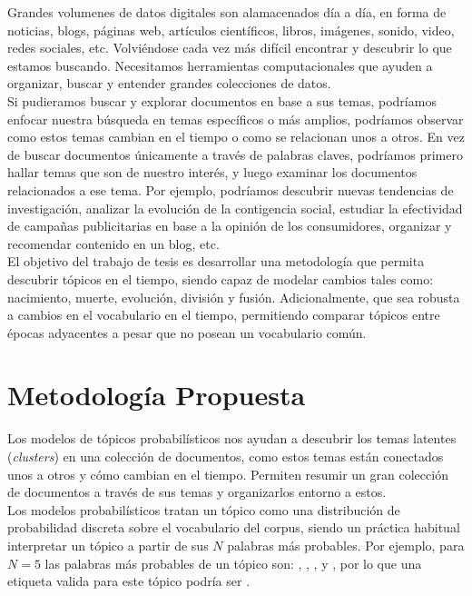 \documentclass[letterpaper,12pt,oneside]{book} %
\begin{document}
Grandes volumenes de datos digitales son alamacenados día a día, en forma de noticias, blogs, páginas web, artículos científicos, libros, imágenes, sonido, video, redes sociales, etc. Volviéndose cada vez más difícil encontrar y descubrir lo que estamos buscando. Necesitamos herramientas computacionales que ayuden a organizar, buscar y entender grandes colecciones de datos.\\

Si pudieramos buscar y explorar documentos en base a sus temas, podríamos enfocar nuestra búsqueda en temas específicos o más amplios, podríamos observar como estos temas cambian en el tiempo o como se relacionan unos a otros. En vez de buscar documentos únicamente a través de palabras claves, podríamos primero hallar temas que son de nuestro interés, y luego examinar los documentos relacionados a ese tema. Por ejemplo, podríamos descubrir nuevas tendencias de investigación, analizar la evolución de la contigencia social, estudiar la efectividad de campañas publicitarias en base a la opinión de los consumidores, organizar y recomendar contenido en un blog, etc.\\

El objetivo del trabajo de tesis es desarrollar una metodología que permita descubrir tópicos en el tiempo, siendo capaz de modelar cambios tales como: nacimiento, muerte, evolución, división y fusión. Adicionalmente, que sea robusta a cambios en el vocabulario en el tiempo, permitiendo comparar tópicos entre épocas adyacentes a pesar que no posean un vocabulario común.

\section{Metodología Propuesta}
Los modelos de tópicos probabilísticos nos ayudan a descubrir los temas latentes (\textit{clusters}) en una colección de documentos, como estos temas están conectados unos a otros y cómo cambian en el tiempo. Permiten resumir un gran colección de documentos a través de sus temas y organizarlos entorno a estos.\\

Los modelos probabilísticos tratan un tópico como una distribución de probabilidad discreta sobre el vocabulario del corpus, siendo un práctica habitual interpretar un tópico a partir de sus $N$ palabras más probables. Por ejemplo, para $N=5$ las palabras más probables de un tópico son: , , ,  y , por lo que una etiqueta valida para este tópico podría ser .\\ 
\end{document}
